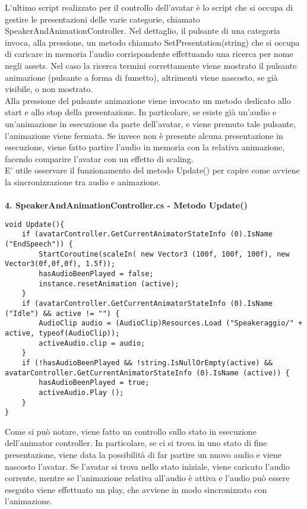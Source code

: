 L'ultimo script realizzato per il controllo dell'avatar \`e lo script che si occupa di gestire le presentazioni delle varie categorie, chiamato SpeakerAndAnimationController. Nel dettaglio, il pulsante di una categoria invoca, alla pressione, un metodo chiamato SetPresentation(string) che si occupa di caricare in memoria l'audio corrispondente effettuando una ricerca per nome negli assets. Nel caso la ricerca termini correttamente viene mostrato il pulsante animazione (pulsante a forma di fumetto), altrimenti viene nascosto, se gi\`a visibile, o non mostrato.\\
Alla pressione del pulsante animazione viene invocato un metodo dedicato allo start e allo stop della presentazione. In particolare, se esiste gi\`a un'audio e un'animazione in esecuzione da parte dell'avatar, e viene premuto tale pulsante, l'animazione viene fermata. Se invece  non \`e presente alcuna presentazione in esecuzione, viene fatto partire l'audio in memoria con la relativa animazione, facendo comparire l'avatar con un effetto di scaling.\\
E' utile osservare il funzionamento del metodo Update() per capire come avviene la sincronizzazione tra audio e animazione.
\\\\
\textbf{4. SpeakerAndAnimationController.cs - Metodo Update()}
\begin{lstlisting}
void Update(){
	if (avatarController.GetCurrentAnimatorStateInfo (0).IsName ("EndSpeech")) {
		StartCoroutine(scaleIn( new Vector3 (100f, 100f, 100f), new Vector3(0f,0f,0f), 1.5f));
		hasAudioBeenPlayed = false;
		instance.resetAnimation (active);
	}
	if (avatarController.GetCurrentAnimatorStateInfo (0).IsName ("Idle") && active != "") {
		AudioClip audio = (AudioClip)Resources.Load ("Speakeraggio/" + active, typeof(AudioClip));
		activeAudio.clip = audio;
	}
	if (!hasAudioBeenPlayed && !string.IsNullOrEmpty(active) && avatarController.GetCurrentAnimatorStateInfo (0).IsName (active)) {
		hasAudioBeenPlayed = true;
		activeAudio.Play ();
	}
}
\end{lstlisting}

Come si pu\`o notare, viene fatto un controllo sullo stato in esecuzione dell'animator controller. In particolare, se ci si trova in uno stato di fine presentazione, viene data la possibilit\`a di far partire un nuovo audio e viene nascosto l'avatar.
Se l'avatar si trova nello stato iniziale, viene caricato l'audio corrente, mentre se l'animazione relativa all'audio \`e attiva e l'audio pu\`o essere eseguito viene effettuato un play, che avviene in modo sincronizzato con l'animazione.\\

